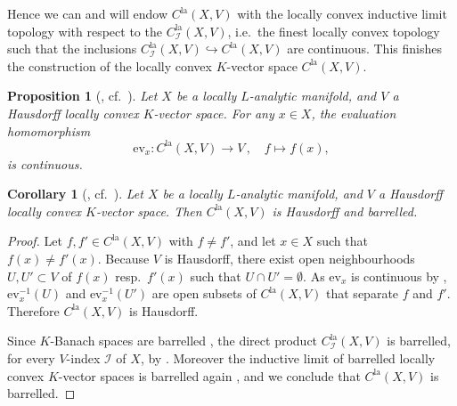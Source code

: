 \documentclass[a4paper, reqno, 10pt]{amsart}
\newtheorem{proposition}[theorem]{Proposition}
\newtheorem{corollary}[theorem]{Corollary}
\theoremstyle{definition}
\numberwithin{equation}{section}
\newcommand{\ev}{{\mathrm{ev}}}
\newcommand{\la}{{\mathrm{la}}}
\newcommand{\lra}{\longrightarrow}
\newcommand{\lto}{\longmapsto}
\newcommand{\CI}{{\mathcal {I}}}
\begin{document}
Hence we can and will endow $C^\la(X,V)$ with the locally convex inductive limit topology with respect to the $C^\la_\CI (X,V)$, i.e.\ the finest locally convex topology such that the inclusions $C^\la_\CI (X,V) \hookrightarrow C^\la(X,V)$ are continuous.
This finishes the construction of the locally convex $K$-vector space $C^\la(X,V)$.



\begin{proposition}[{\cite[Satz 2.1.10]{FeauxdeLacroix99TopDarstpAdischLieGrp}, cf.\ \cite[Prop.\ 12.1]{Schneider11pAdicLieGrps}}]\label{Prop 1 - Evaluation maps are continuous}
	Let $X$ be a locally $L$-analytic manifold, and $V$ a Hausdorff locally convex $K$-vector space.
	For any $x\in X$, the evaluation homomorphism
	\begin{equation*}
		\ev_x \colon C^\la(X,V) \lra V \,,\quad f \lto f(x),
	\end{equation*}
	is continuous.
\end{proposition}



\begin{corollary}[{\cite[Satz 2.1.10]{FeauxdeLacroix99TopDarstpAdischLieGrp}, cf.\ \cite[Cor.\ 12.2]{Schneider11pAdicLieGrps}}]\label{Cor 1 - Space of locally analytic functions is Hausdorff and barrelled}
	Let $X$ be a locally $L$-analytic manifold, and $V$ a Hausdorff locally convex $K$-vector space.
	Then $C^\la(X,V)$ is Hausdorff and barrelled.
\end{corollary}
\begin{proof}
	Let $f, f' \in C^\la(X,V)$ with $f\neq f'$, and let $x\in X$ such that $f(x) \neq f'(x)$.
	Because $V$ is Hausdorff, there exist open neighbourhoods $U, U'\subset V$ of $f(x)$ resp.\ $f'(x)$ such that $U\cap U' = \emptyset$.
	As $\ev_x$ is continuous by , $\ev_x^{-1}(U)$ and $\ev_x^{-1}(U')$ are open subsets of $C^\la(X,V)$ that separate $f$ and $f'$. 
	Therefore $C^\la(X,V)$ is Hausdorff.
	
	
	Since $K$-Banach spaces are barrelled \cite[Expl.\ 2) after Cor.\ 6.16]{Schneider02NonArchFunctAna}, the direct product $C^\la_\CI (X,V)$ is barrelled, for every $V$-index $\CI$ of $X$, by \cite[Prop.\ 14.3]{Schneider02NonArchFunctAna}.
	Moreover the inductive limit of barrelled locally convex $K$-vector spaces is barrelled again \cite[Expl.\ 3) after Cor.\ 6.16]{Schneider02NonArchFunctAna}, and we conclude that $C^\la(X,V)$ is barrelled.	
\end{proof}
\end{document}
